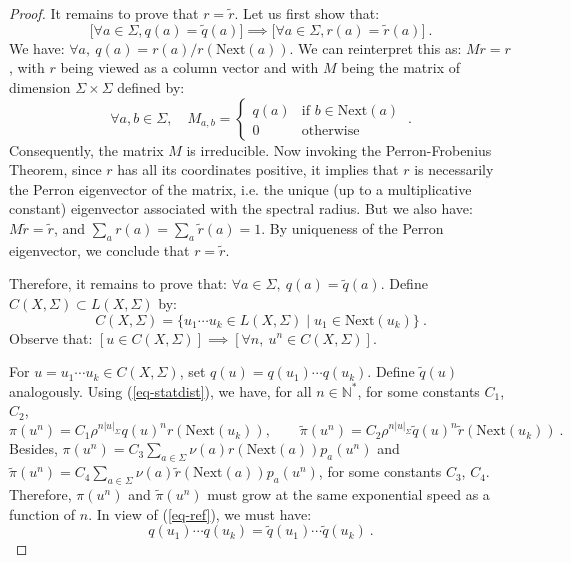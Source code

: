 \documentclass[11pt,a4paper]{article}
\theoremstyle{remark}
\def\Blackboardfont{\mathbb}
\def\rig{\text{Next}}
\def\N{{\Blackboardfont N}}
\def\eref#1{(\ref{#1})}
\begin{document}
\begin{proof}
It remains to prove that $r=\tilde{r}$.
Let us first show that:
\begin{equation}\label{eq-qr}
\bigl[ \forall a \in \Sigma, q(a)= \tilde{q}(a) \bigr] \implies \bigl[
  \forall a \in \Sigma, r(a)= \tilde{r}(a) \bigr]\:.
\end{equation}
We have: $\forall a, \ q(a) =r(a)/r(\rig(a))$. We can reinterpret this
as: $Mr=r$, with $r$ being viewed as a column vector and with $M$
being the matrix of dimension $\Sigma\times \Sigma$ defined by:
\[
\forall a,b \in \Sigma, \quad M_{a,b} = \begin{cases} q(a) &
\text{if
  } b \in \rig(a) \\
0 & \text{otherwise}
\end{cases} \:.
\]
 Consequently, the 
matrix $M$ is irreducible. 
Now invoking the Perron-Frobenius Theorem, since $r$ has all its
coordinates positive, it implies that $r$ is necessarily the
Perron eigenvector of the matrix, i.e. the unique (up to a
multiplicative constant) eigenvector associated with the spectral
radius. But we also have: $M\tilde{r}=\tilde{r}$, and $\sum_{a}
r(a) =\sum_{a}\tilde{r}(a) =1$. By uniqueness of the Perron
eigenvector, we conclude that $r=\tilde{r}$.

\medskip

Therefore, it remains to prove that: $\forall a\in \Sigma, \
q(a)=\tilde{q}(a)$.
Define $C(X,\Sigma)\subset L(X,\Sigma)$ by:
\[
C(X,\Sigma) = \{ u_1\cdots u_k\in
L(X,\Sigma) \mid u_1\in \rig(u_k) \}\:.
\]
Observe that: $[u\in C(X,\Sigma)] \implies [\forall n, \ u^n \in
  C(X,\Sigma)]$.

For $u=u_1\cdots u_k\in C(X,\Sigma)$, set $q(u)=q(u_1)\cdots
q(u_k)$. Define $\tilde{q}(u)$ analogously. Using
\eref{eq-statdist}, we have, for all $n\in \N^*$, for some
constants $C_1$, $C_2$,
\begin{equation}\label{eq-ref}
\pi(u^n) =C_1\rho^{n|u|_{\Sigma}}
q(u)^nr(\rig(u_k)),\qquad \tilde{\pi}(u^n) =C_2
\rho^{n|u|_{\Sigma}} \tilde{q}(u)^n \tilde{r}(\rig(u_k))\:.
\end{equation}
Besides, $\pi(u^n) = C_3\sum_{a\in \Sigma} \nu(a)r(\rig(a))
p_a(u^n)$ and $\tilde{\pi}(u^n) = C_4\sum_{a\in \Sigma}
\nu(a)\tilde{r}(\rig(a)) p_a(u^n)$, for some constants $C_3$,
$C_4$. Therefore, $\pi(u^n)$ and $\tilde{\pi}(u^n)$ must grow at the
same exponential speed as a function of $n$. In view of \eref{eq-ref},
we must have: 
\begin{equation}\label{eq-circ}
q(u_1)\cdots q(u_k)=\tilde{q}(u_1)\cdots \tilde{q}(u_k) \:.
\end{equation}


\end{proof}
\end{document}
